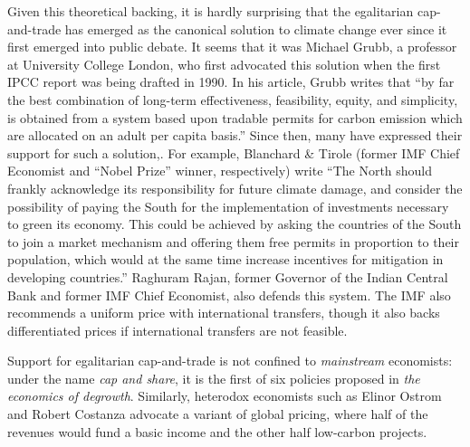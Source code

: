 \documentclass[12pt,english]{article}
\begin{document}
Given this theoretical backing, it is hardly surprising that the egalitarian cap-and-trade has emerged as the canonical solution to climate change ever since it first emerged into public debate. It seems that it was Michael Grubb, a professor at University College London, who first advocated this solution when the first IPCC report was being drafted in 1990.\citep{grubb_greenhouse_1990} In his article, Grubb writes that ``by far the best combination of long-term effectiveness, feasibility, equity, and simplicity, is obtained from a system based upon tradable permits for carbon emission which are allocated on an adult per capita basis.'' %
Since then, many have expressed their support for such a solution,\citep{aagarwal_global_1991,bertram_tradeable_1992,baer_equity_2000,jamieson_climate_2001,van_den_bergh_dual-track_2020,cramton_global_2017}. For example, Blanchard \& Tirole\citep{blanchard_major_2021} (former IMF Chief Economist and ``Nobel Prize'' winner, respectively) write ``The North should
frankly acknowledge its responsibility for future climate damage, and consider the possibility of paying the South for the implementation of investments necessary to green its economy. This could be achieved by asking the countries of the South to join a %
market mechanism and offering them free permits in proportion to their population, which would at the same time increase incentives for mitigation in developing countries.'' Raghuram Rajan, former Governor of the Indian Central Bank and former IMF Chief Economist, also defends this system.\citep{rajan_global_2021} The IMF also recommends a uniform price with international transfers, though it also backs differentiated prices if international transfers are not feasible.\citep{imf_how_2019}

Support for egalitarian cap-and-trade is not confined to \textit{mainstream} economists: under the name \textit{cap and share}, it is the first of six policies proposed in \textit{the economics of degrowth}.\citep{kallis_economics_2012} Similarly, heterodox economists such as Elinor Ostrom and Robert Costanza advocate a variant of global pricing, where half of the revenues would fund a basic income and the other half low-carbon projects.\citep{barnes_creating_2008} 
\end{document}
